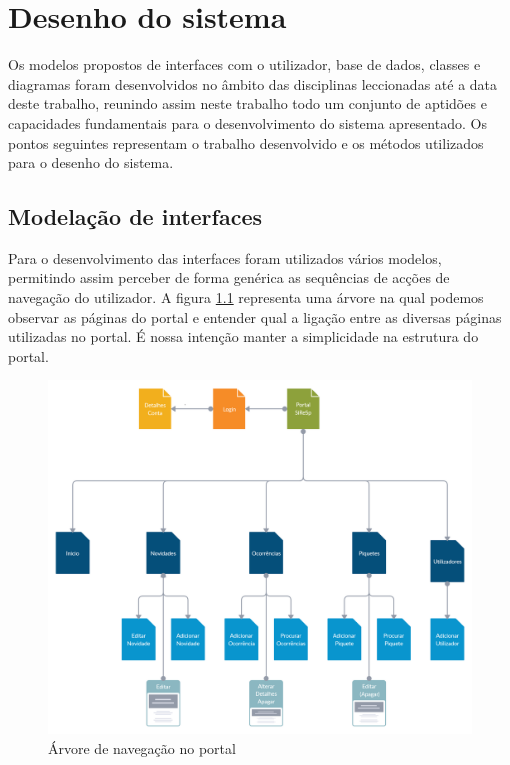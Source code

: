 \chapter{Desenho do sistema}
\label{cap3}

Os modelos propostos de interfaces com o utilizador, base de dados, classes e diagramas foram desenvolvidos no âmbito das disciplinas leccionadas até a data deste trabalho, reunindo assim neste trabalho todo um conjunto de aptidões e capacidades fundamentais para o desenvolvimento do sistema apresentado. Os pontos seguintes representam o trabalho desenvolvido e os métodos utilizados para o desenho do sistema.

\section{Modelação de interfaces}

Para o desenvolvimento das interfaces foram utilizados vários modelos, permitindo assim perceber de forma genérica as sequências de acções de navegação do utilizador. A figura \ref{fig:diagrama_arvore} representa uma árvore na qual podemos observar as páginas do portal e entender qual a ligação entre as diversas páginas utilizadas no portal.
É nossa intenção manter a simplicidade na estrutura do portal.

\begin{figure}[!h]
	\centering
	\includegraphics[width=\textwidth]{figuras/diagrama_arvore.png}
	\caption{Árvore de navegação no portal}
	\label{fig:diagrama_arvore}
\end{figure}

